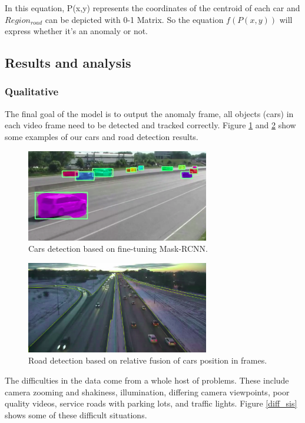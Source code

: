 \documentclass[10pt,twocolumn,letterpaper]{article}
\begin{document}
In this equation, P(x,y) represents the coordinates of the centroid of each car and $Region_{road}$ can be depicted with 0-1 Matrix. So the equation $f(P(x, y))$ will express whether it's an anomaly or not.

\subsection{Results and analysis}
\subsubsection{Qualitative}
The final goal of the model is to output the anomaly frame, all objects (cars) in each video frame need to be detected and tracked correctly. Figure \ref{detect_car} and \ref{detect_road} show some examples of our cars and road detection results. 

\begin{figure}  
    \includegraphics[width=8cm]{images/tunning1.png}
    \caption{Cars detection based on fine-tuning Mask-RCNN.}
    \label{detect_car}
	\end{figure}

\begin{figure}  
    \includegraphics[width=8cm]{images/tunning2.png}
    \caption{Road detection based on relative fusion of cars position in frames.}
    \label{detect_road}
	\end{figure}

The difficulties in the data come from a whole host of problems. These include camera zooming and shakiness, illumination, differing camera viewpoints, poor quality videos, service roads with parking lots, and traffic lights. Figure \ref{diff_sis} shows some of these difficult situations.
\end{document}
